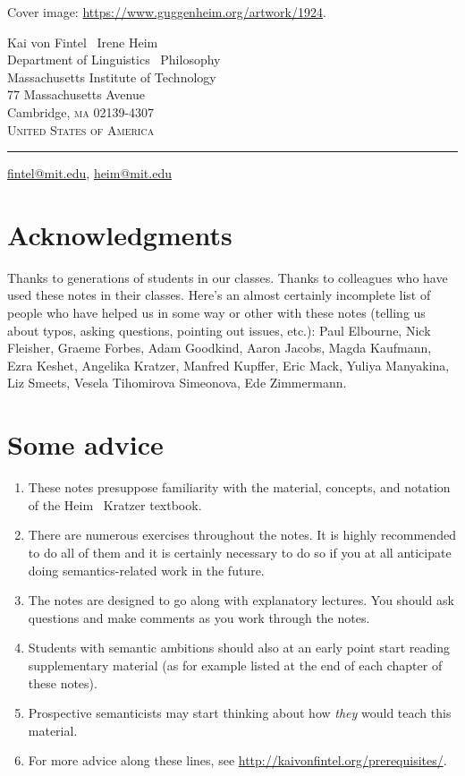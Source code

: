 \medskip

\noindent Cover image: \url{https://www.guggenheim.org/artwork/1924}.

\vfill

\noindent Kai von Fintel \amp\ Irene Heim\\
Department of Linguistics \amp\ Philosophy\\
Massachusetts Institute of Technology\\
77 Massachusetts Avenue\\
Cambridge, \textsc{ma} 02139-4307\\
\textsc{United States of America} 

\plainbreak{1}

\href{mailto:fintel@mit.edu}{fintel@mit.edu}, \href{mailto:heim@mit.edu}{heim@mit.edu}

\cleardoublepage

\null
\vfill \ba 

\section*{Acknowledgments}

Thanks to generations of students in our classes. Thanks to colleagues who have
used these notes in their classes. Here's an almost certainly incomplete list of
people who have helped us in some way or other with these notes (telling us
about typos, asking questions, pointing out issues, etc.): Paul Elbourne, Nick
Fleisher, Graeme Forbes, Adam Goodkind, Aaron Jacobs, Magda Kaufmann, Ezra
Keshet, Angelika Kratzer, Manfred Kupffer, Eric Mack, Yuliya Manyakina, Liz
Smeets, Vesela Tihomirova Simeonova, Ede Zimmermann.

\section*{Some advice}
\begin{enumerate}
\item These notes presuppose familiarity with the material, concepts, and
  notation of the Heim \amp\ Kratzer textbook.
\item There are numerous exercises throughout the notes. It is highly
  recommended to do all of them and it is certainly necessary to do so if you at
  all anticipate doing semantics-related work in the future.
\item The notes are designed to go along with explanatory lectures. You should
  ask questions and make comments as you work through the notes.
\item Students with semantic ambitions should also at an early point start
  reading supplementary material (as for example listed at the end of each
  chapter of these notes).
\item Prospective semanticists may start thinking about how \emph{they} would
  teach this material.
\item For more advice along these lines, see
  \url{http://kaivonfintel.org/prerequisites/}.
\end{enumerate}

\ab 
\vfill\null

\newpage\hbox{}
\vfill{\scshape{}}
\vfill\hbox{}\thispagestyle{cleared}

\cleardoublepage

\tableofcontents*

\cleardoublepage